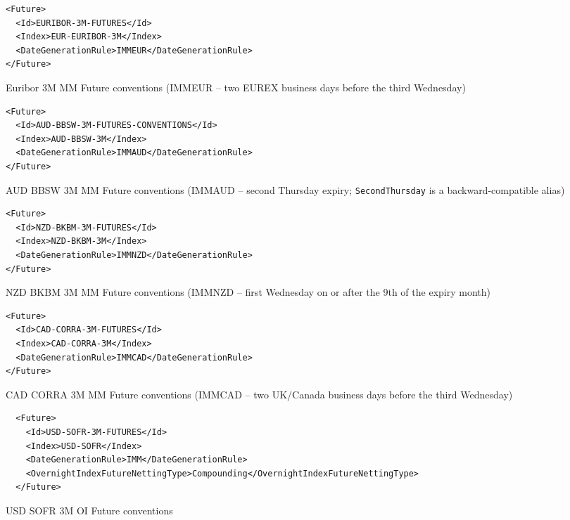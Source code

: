 \begin{listing}[H]
\begin{verbatim}
<Future>
  <Id>EURIBOR-3M-FUTURES</Id>
  <Index>EUR-EURIBOR-3M</Index>
  <DateGenerationRule>IMMEUR</DateGenerationRule>
</Future>
\end{verbatim}
\caption{Euribor 3M MM Future conventions (IMMEUR -- two EUREX business days before the third Wednesday)}
\label{lst:future_conventions_euribor_3m}
\end{listing}

\begin{listing}[H]
\begin{verbatim}
<Future>
  <Id>AUD-BBSW-3M-FUTURES-CONVENTIONS</Id>
  <Index>AUD-BBSW-3M</Index>
  <DateGenerationRule>IMMAUD</DateGenerationRule>
</Future>
\end{verbatim}
\caption{AUD BBSW 3M MM Future conventions (IMMAUD -- second Thursday expiry; \texttt{SecondThursday} is a
backward-compatible alias)}
\label{lst:future_conventions_aud_bbsw_3m}
\end{listing}

\begin{listing}[H]
\begin{verbatim}
<Future>
  <Id>NZD-BKBM-3M-FUTURES</Id>
  <Index>NZD-BKBM-3M</Index>
  <DateGenerationRule>IMMNZD</DateGenerationRule>
</Future>
\end{verbatim}
\caption{NZD BKBM 3M MM Future conventions (IMMNZD -- first Wednesday on or after the 9th of the expiry month)}
\label{lst:future_conventions_nzd_bkbm_3m}
\end{listing}

\begin{listing}[H]
\begin{verbatim}
<Future>
  <Id>CAD-CORRA-3M-FUTURES</Id>
  <Index>CAD-CORRA-3M</Index>
  <DateGenerationRule>IMMCAD</DateGenerationRule>
</Future>
\end{verbatim}
\caption{CAD CORRA 3M MM Future conventions (IMMCAD -- two UK/Canada business days before the third Wednesday)}
\label{lst:future_conventions_cad_corra_3m}
\end{listing}

\begin{listing}[H]
\begin{verbatim}
  <Future>
    <Id>USD-SOFR-3M-FUTURES</Id>
    <Index>USD-SOFR</Index>
    <DateGenerationRule>IMM</DateGenerationRule>
    <OvernightIndexFutureNettingType>Compounding</OvernightIndexFutureNettingType>
  </Future>
\end{verbatim}
\caption{USD SOFR 3M OI Future conventions}
\label{lst:future_conventions_sofr_3m}
\end{listing}

